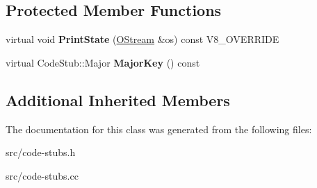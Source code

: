 \subsection*{Protected Member Functions}
\begin{DoxyCompactItemize}
\item 
\hypertarget{classv8_1_1internal_1_1_call_i_c___array_stub_a5ab560886fb7a21313ece6e1a81e5136}{}virtual void {\bfseries Print\+State} (\hyperlink{classv8_1_1internal_1_1_o_stream}{O\+Stream} \&os) const V8\+\_\+\+O\+V\+E\+R\+R\+I\+D\+E\label{classv8_1_1internal_1_1_call_i_c___array_stub_a5ab560886fb7a21313ece6e1a81e5136}

\item 
\hypertarget{classv8_1_1internal_1_1_call_i_c___array_stub_a418ef6e0987e5170ef6034afb4891e4e}{}virtual Code\+Stub\+::\+Major {\bfseries Major\+Key} () const \label{classv8_1_1internal_1_1_call_i_c___array_stub_a418ef6e0987e5170ef6034afb4891e4e}

\end{DoxyCompactItemize}
\subsection*{Additional Inherited Members}


The documentation for this class was generated from the following files\+:\begin{DoxyCompactItemize}
\item 
src/code-\/stubs.\+h\item 
src/code-\/stubs.\+cc\end{DoxyCompactItemize}
